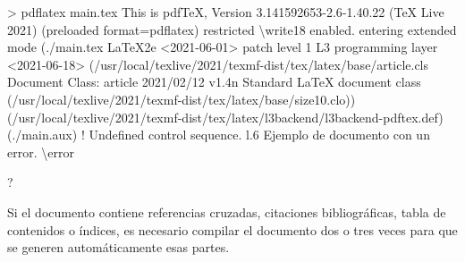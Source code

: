 \documentclass[
  letterpaper,
  DIV=11,
  numbers=noendperiod]{scrreport}
\newenvironment{Shaded}{\begin{snugshade}}{\end{snugshade}}
\newcommand{\DataTypeTok}[1]{\textcolor[rgb]{0.68,0.00,0.00}{#1}}
\newcommand{\ErrorTok}[1]{\textcolor[rgb]{0.68,0.00,0.00}{#1}}
\newcommand{\ExtensionTok}[1]{\textcolor[rgb]{0.00,0.23,0.31}{#1}}
\newcommand{\KeywordTok}[1]{\textcolor[rgb]{0.00,0.23,0.31}{#1}}
\newcommand{\NormalTok}[1]{\textcolor[rgb]{0.00,0.23,0.31}{#1}}
\newcommand{\OperatorTok}[1]{\textcolor[rgb]{0.37,0.37,0.37}{#1}}
\newcommand{\OtherTok}[1]{\textcolor[rgb]{0.00,0.23,0.31}{#1}}
\newcommand{\VariableTok}[1]{\textcolor[rgb]{0.07,0.07,0.07}{#1}}
\begin{document}
\begin{Shaded}
\begin{Highlighting}[]
\OperatorTok{\textgreater{}}\NormalTok{ pdflatex }\ExtensionTok{main.tex}
\ExtensionTok{This}\NormalTok{ is pdfTeX, Version 3.141592653{-}2.6{-}1.40.22 }\ErrorTok{(}\ExtensionTok{TeX}\NormalTok{ Live 2021}\KeywordTok{)} \KeywordTok{(}\ExtensionTok{preloaded} 
\VariableTok{format}\OperatorTok{=}\NormalTok{pdflatex}\KeywordTok{)} \ExtensionTok{restricted} \DataTypeTok{\textbackslash{}w}\NormalTok{rite18 enabled.}
\ExtensionTok{entering}\NormalTok{ extended mode}
\KeywordTok{(}\ExtensionTok{./main.tex}
\ExtensionTok{LaTeX2e} \OperatorTok{\textless{}}\NormalTok{2021{-}06{-}01}\OperatorTok{\textgreater{}}\NormalTok{ patch level 1}
\ExtensionTok{L3}\NormalTok{ programming layer }\OperatorTok{\textless{}}\NormalTok{2021{-}06{-}18}\OperatorTok{\textgreater{}}
\KeywordTok{(}\ExtensionTok{/usr/local/texlive/2021/texmf{-}dist/tex/latex/base/article.cls}
\ExtensionTok{Document}\NormalTok{ Class: article 2021/02/12 v1.4n Standard LaTeX document class}
\KeywordTok{(}\ExtensionTok{/usr/local/texlive/2021/texmf{-}dist/tex/latex/base/size10.clo}\KeywordTok{))}
\KeywordTok{(}\ExtensionTok{/usr/local/texlive/2021/texmf{-}dist/tex/latex/l3backend/l3backend{-}pdftex.def}\KeywordTok{)}
\KeywordTok{(}\ExtensionTok{./main.aux}\KeywordTok{)}
\OtherTok{! }\ExtensionTok{Undefined}\NormalTok{ control sequence.}
\ExtensionTok{l.6}\NormalTok{ Ejemplo de documento con un error. }\DataTypeTok{\textbackslash{}e}\NormalTok{rror}
                                             
\ExtensionTok{?} 
\end{Highlighting}
\end{Shaded}

\begin{tcolorbox}[enhanced jigsaw, arc=.35mm, toprule=.15mm, opacitybacktitle=0.6, colback=white, coltitle=black, colbacktitle=quarto-callout-warning-color!10!white, breakable, colframe=quarto-callout-warning-color-frame, left=2mm, opacityback=0, bottomtitle=1mm, toptitle=1mm, titlerule=0mm, title=\textcolor{quarto-callout-warning-color}{\faExclamationTriangle}\hspace{0.5em}{Advertencia}, bottomrule=.15mm, leftrule=.75mm, rightrule=.15mm]
Si el documento contiene referencias cruzadas, citaciones
bibliográficas, tabla de contenidos o índices, es necesario compilar el
documento dos o tres veces para que se generen automáticamente esas
partes.
\end{tcolorbox}
\end{document}
